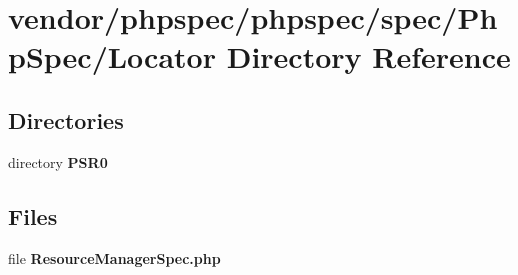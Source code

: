 \section{vendor/phpspec/phpspec/spec/\+Php\+Spec/\+Locator Directory Reference}
\label{dir_8752f1f6cb340966a8d793e41d2e526f}
\subsection*{Directories}
\begin{DoxyCompactItemize}
\item 
directory {\bf P\+S\+R0}
\end{DoxyCompactItemize}
\subsection*{Files}
\begin{DoxyCompactItemize}
\item 
file {\bf Resource\+Manager\+Spec.\+php}
\end{DoxyCompactItemize}
